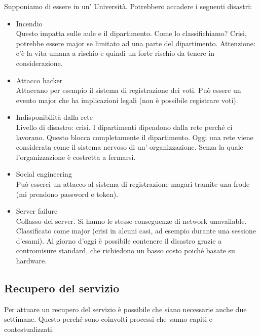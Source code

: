 Supponiamo di essere in un' Università.
Potrebbero accadere i seguenti disastri:
\begin{itemize}
 \item Incendio \\
 Questo impatta sulle aule e il dipartimento. Come lo
classifichiamo? Crisi, potrebbe essere major se limitato ad una parte del
dipartimento. Attenzione: c'è la vita umana a rischio e quindi un forte
rischio da tenere in considerazione.

 \item Attacco hacker \\
 Attaccano per esempio il sistema di registrazione dei voti. Può essere un
evento major che ha implicazioni legali (non \`e possibile registrare voti).

 \item Indisponibilità dalla rete \\
 Livello di disastro: crisi. I dipartimenti dipendono dalla rete perché
ci lavorano. Questo blocca completamente il dipartimento. Oggi una rete viene
considerata come il sistema nervoso di un' organizzazione. Senza la quale
l'organizzazione è costretta a fermarsi.

 \item Social engineering \\
 Può esserci un attacco al sistema di registrazione magari tramite una frode
(mi prendono password e token).

 \item Server failure \\
 Collasso dei server. Si hanno le stesse conseguenze di network unavailable.
Classificato come major (crisi in alcuni casi, ad esempio durante una sessione
d'esami). Al giorno d'oggi è possibile contenere il disastro grazie a
contromisure
standard, che richiedono un basso costo poiché basate su hardware.
\end{itemize}

\subsection{Recupero del servizio}

Per attuare un recupero del servizio è possibile che siano necessarie anche due
settimane.
Questo perché sono coinvolti processi che vanno capiti e contestualizzati.

